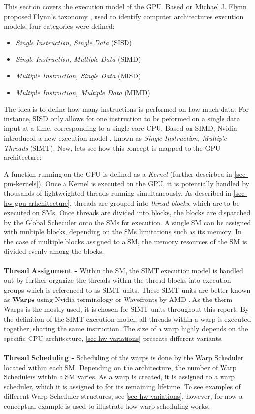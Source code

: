 
This section covers the execution model of the GPU.
Based on Michael J. Flynn proposed Flynn's taxonomy \cite{Flynn1972}, used to identify computer architectures execution models, four categories were defined:

\begin{itemize}
	\item \textit{Single Instruction, Single Data} (SISD)
	\item \textit{Single Instruction, Multiple Data} (SIMD)
	\item \textit{Multiple Instruction, Single Data} (MISD)
	\item \textit{Multiple Instruction, Multiple Data} (MIMD)
\end{itemize}

The idea is to define how many instructions is performed on how much data.
For instance, SISD only allows for one instruction to be peformed on a single data input at a time, corresponding to a single-core CPU.
Based on SIMD, Nvidia introduced a new execution model \cite{Nvidia2009}, known as \textit{Single Instruction, Multiple Threads} (SIMT).
Now, lets see how this concept is mapped to the GPU architecture:


A function running on the GPU is defined as a \textit{Kernel} (further descirbed in \cref{sec-pm-kernels}).
Once a Kernel is executed on the GPU, it is potentially handled by thousands of lightweighted threads running simultaneously.
As described in \cref{sec-hw-gpu-arhchitecture}, threads are grouped into \textit{thread blocks}, which are to be executed on SMs.
Once threads are divided into blocks, the blocks are dispatched by the Global Scheduler onto the SMs for execution.
A single SM can be assigned with multiple blocks, depending on the SMs limitations such as its memory.
In the case of multiple blocks assigned to a SM, the memory resources of the SM is divided evenly among the blocks.
\\\\
\textbf{Thread Assignment -} Within the SM, the SIMT execution model is handled out by further organize the threads within the thread blocks into execution groups which is referenced to as SIMT units.
These SIMT units are better known as \textbf{Warps} using Nvidia terminology \cite{Nvidia2009} or Wavefronts by AMD \cite{Johansson2010}.
As the therm Warps is the mostly used, it is chosen for SIMT units throughout this report.
By the definition of the SIMT execution model, all threads within a warp is executed together, sharing the same instruction.
The size of a warp highly depends on the specific GPU architecture, \cref{sec-hw-variations} presents different variants.
\\\\
\textbf{Thread Scheduling -} Scheduling of the warps is done by the Warp  Scheduler located within each SM.
Depending on the architecture, the number of Warp Schedulers within a SM varies.
As a warp is created, it is assigned to a warp scheduler, which it is assigned to for its remaining lifetime.
To see examples of different Warp Scheduler structures, see \cref{sec-hw-variations}, however, for now a conceptual example is used to illustrate how warp scheduling works.

